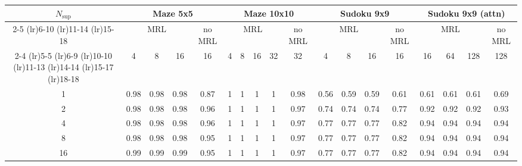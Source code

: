 \documentclass{article}
\begin{document}
\begin{center}
\footnotesize
\setlength{\tabcolsep}{5pt}
    \label{tab:eval-results}
    \begin{tabular}{c ccccccccccccccccc}
    \toprule
    \multirow{4}{*}{$N_{\mathrm{sup}}$} &
    \multicolumn{4}{c}{Maze 5x5} &
    \multicolumn{5}{c}{Maze 10x10} &
    \multicolumn{4}{c}{Sudoku 9x9} &
    \multicolumn{4}{c}{Sudoku 9x9 (attn)} \\
    \cmidrule(lr){2-5}
    \cmidrule(lr){6-10}
    \cmidrule(lr){11-14}
    \cmidrule(lr){15-18}
    &
    \multicolumn{3}{c}{MRL} & \multicolumn{1}{c}{no MRL} &
    \multicolumn{4}{c}{MRL} & \multicolumn{1}{c}{no MRL} &
    \multicolumn{3}{c}{MRL} & \multicolumn{1}{c}{no MRL} &
    \multicolumn{3}{c}{MRL} & \multicolumn{1}{c}{no MRL} \\
    \cmidrule(lr){2-4} \cmidrule(lr){5-5}
    \cmidrule(lr){6-9} \cmidrule(lr){10-10}
    \cmidrule(lr){11-13} \cmidrule(lr){14-14}
    \cmidrule(lr){15-17} \cmidrule(lr){18-18}
    &
    4 & 8 & 16 & 16 &
    4 & 8 & 16 & 32 & 32 &
    4 & 8 & 16 & 16 &
    16 & 64 & 128 & 128 \\
    \midrule
    1  & 0.98 & 0.98 & 0.98 & 0.87 &
        1 & 1 & 1 & 1 & 0.98 &
        0.56 & 0.59 & 0.59 & 0.61 &
        0.61 & 0.61 & 0.61 & 0.69 \\
    2  & 0.98 & 0.98 & 0.98 & 0.96 &
        1 & 1 & 1 & 1 & 0.97 &
        0.74 & 0.74 & 0.74 & 0.77 &
        0.92 & 0.92 & 0.92 & 0.93 \\
    4  & 0.98 & 0.98 & 0.98 & 0.96 &
        1 & 1 & 1 & 1 & 0.97 &
        0.77 & 0.77 & 0.77 & 0.82 &
        0.94 & 0.94 & 0.94 & 0.94 \\
    8  & 0.98 & 0.98 & 0.98 & 0.95 &
        1 & 1 & 1 & 1 & 0.97 &
        0.77 & 0.77 & 0.77 & 0.82 &
        0.94 & 0.94 & 0.94 & 0.94 \\
    16 & 0.99 & 0.99 & 0.99 & 0.95 &
        1 & 1 & 1 & 1 & 0.97 &
        0.77 & 0.77 & 0.77 & 0.82 &
        0.94 & 0.94 & 0.94 & 0.94 \\
    \bottomrule
    \end{tabular}
\end{center}
\end{document}
